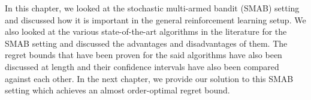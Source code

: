 In this chapter, we looked at the stochastic multi-armed bandit (SMAB) setting and discussed how it is important in the general reinforcement learning setup. We also looked at the various state-of-the-art algorithms in the literature for the SMAB setting and discussed the advantages and disadvantages of them. The regret bounds that have been proven for the said algorithms have also been discussed at length and their confidence intervals have also been compared against each other. In the next chapter, we provide our solution to this SMAB setting which achieves an almost order-optimal regret bound.